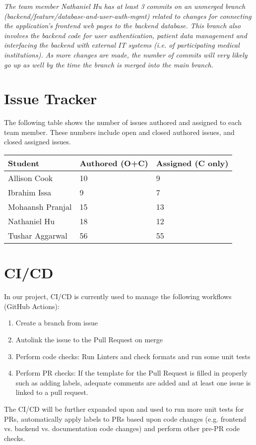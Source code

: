 \documentclass{article}
\begin{document}
\noindent \textit{The team member Nathaniel Hu has at least 3 commits on an
unmerged branch (backend/feature/database-and-user-auth-mgmt) related to changes
for connecting the application's frontend web pages to the backend database. This
branch also involves the backend code for user authentication, patient data
management and interfacing the backend with external IT systems (i.e. of
participating medical institutions). As more changes are made, the number of
commits will very likely go up as well by the time the branch is merged into the
main branch.}

\section{Issue Tracker}

The following table shows the number of issues authored and assigned to each team
member. These numbers include open and closed authored issues, and closed assigned
issues.

\begin{table}[H]
  \centering
  \begin{tabular}{lll}
    \toprule
    \textbf{Student} & \textbf{Authored (O+C)} & \textbf{Assigned (C only)} \\
    \midrule
    Allison Cook & 10 & 9 \\
    Ibrahim Issa & 9 & 7 \\
    Mohaansh Pranjal & 15 & 13 \\
    Nathaniel Hu & 18 & 12 \\
    Tushar Aggarwal & 56 & 55 \\
    \bottomrule
  \end{tabular}
\end{table}

\section{CI/CD}

In our project, CI/CD is currently used to manage the following workflows
(GitHub Actions):
\begin{enumerate}
  \item Create a branch from issue
  \item Autolink the issue to the Pull Request on merge
  \item Perform code checks: Run Linters and check formats and run some unit tests
  \item Perform PR checks: If the template for the Pull Request is filled in
    properly such as adding labels, adequate comments are added and at least one
    issue is linked to a pull request.
\end{enumerate}
The CI/CD will be further expanded upon and used to run more unit tests for PRs,
automatically apply labels to PRs based upon code changes (e.g. frontend vs.
backend vs. documentation code changes) and perform other pre-PR code checks.
\end{document}
